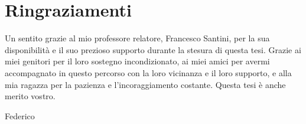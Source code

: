 \chapter*{Ringraziamenti}

Un sentito grazie al mio professore relatore, 
Francesco Santini, per la sua disponibilità e 
il suo prezioso supporto durante la stesura di questa tesi. 
Grazie ai miei genitori per il loro sostegno incondizionato, 
ai miei amici per avermi accompagnato 
in questo percorso con la loro vicinanza e il loro supporto, 
e alla mia ragazza per la pazienza e l’incoraggiamento costante. 
Questa tesi è anche merito vostro.

\vspace{17mm}

\vs
\begin{flushright}
 Federico
\end{flushright}

